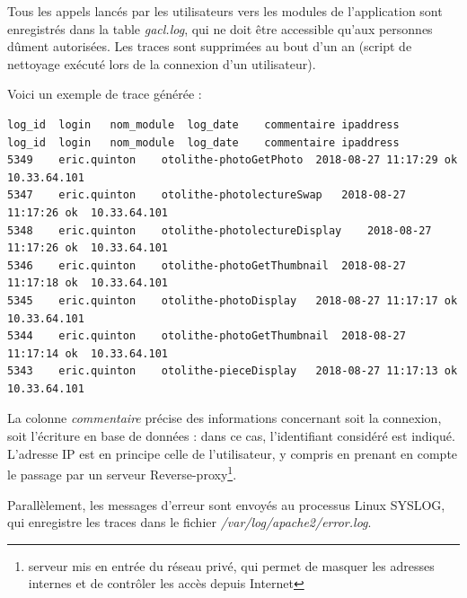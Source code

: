 Tous les appels lancés par les utilisateurs vers les modules de l'application sont enregistrés dans la table \textit{gacl.log}, qui ne doit être accessible qu'aux personnes dûment autorisées. Les traces sont supprimées au bout d'un an (script de nettoyage exécuté lors de la connexion d'un utilisateur).

Voici un exemple de trace générée :
\begin{lstlisting}
log_id	login	nom_module	log_date	commentaire	ipaddress
log_id	login	nom_module	log_date	commentaire	ipaddress
5349	eric.quinton	otolithe-photoGetPhoto	2018-08-27 11:17:29	ok	10.33.64.101
5347	eric.quinton	otolithe-photolectureSwap	2018-08-27 11:17:26	ok	10.33.64.101
5348	eric.quinton	otolithe-photolectureDisplay	2018-08-27 11:17:26	ok	10.33.64.101
5346	eric.quinton	otolithe-photoGetThumbnail	2018-08-27 11:17:18	ok	10.33.64.101
5345	eric.quinton	otolithe-photoDisplay	2018-08-27 11:17:17	ok	10.33.64.101
5344	eric.quinton	otolithe-photoGetThumbnail	2018-08-27 11:17:14	ok	10.33.64.101
5343	eric.quinton	otolithe-pieceDisplay	2018-08-27 11:17:13	ok	10.33.64.101

\end{lstlisting}

La colonne \textit{commentaire} précise des informations concernant soit la connexion, soit l'écriture en base de données : dans ce cas, l'identifiant considéré est indiqué.
L'adresse IP est en principe celle de l'utilisateur, y compris en prenant en compte le passage par un serveur Reverse-proxy\footnote{serveur mis en entrée du réseau privé, qui permet de masquer les adresses internes et de contrôler les accès depuis Internet}.

Parallèlement, les messages d'erreur sont envoyés au processus Linux SYSLOG, qui enregistre les traces dans le fichier \textit{/var/log/apache2/error.log}.